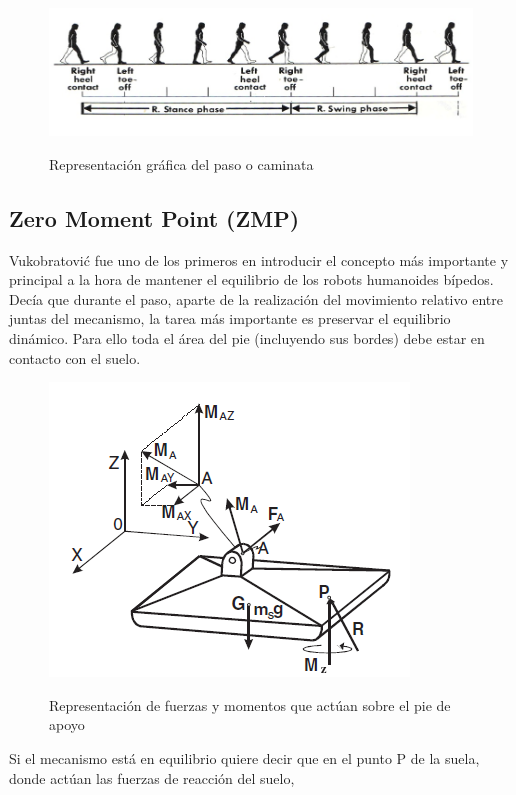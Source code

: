 \begin{figure}[H]
\centering
{\includegraphics[scale=0.63]{imagenes/apartado_2/221_ciclo_paso_humano}}
\caption{Representación gráfica del paso o caminata}
\label{figura221}
\end{figure}

\newpage

\subsection{Zero Moment Point (ZMP)}

Vukobratović \cite{ref16} fue uno de los primeros en introducir el concepto más importante y principal a la hora de mantener el equilibrio de los robots humanoides bípedos. Decía que durante el paso, aparte de la realización del movimiento relativo entre juntas del mecanismo, la tarea más importante es preservar el equilibrio dinámico. Para ello toda el área del pie (incluyendo sus bordes) debe estar en contacto con el suelo.

\begin{figure}[H]
\centering
{\includegraphics[scale=0.6]{imagenes/apartado_2/222_fuerzas_momentos}}
\caption{Representación de fuerzas y momentos que actúan sobre el pie de apoyo}
\label{figura222}
\end{figure}

Si el mecanismo está en equilibrio quiere decir que en el punto P de la suela, donde actúan las fuerzas de reacción del suelo,

